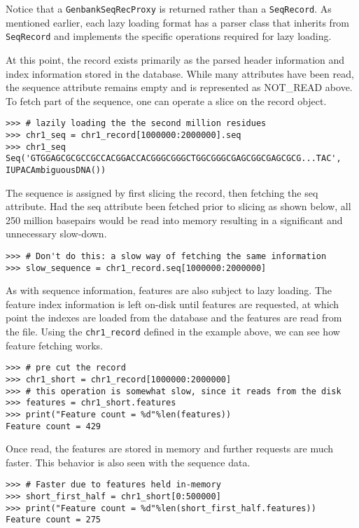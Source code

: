\documentclass{report}
\begin{document}
Notice that a \verb|GenbankSeqRecProxy| is returned rather than a
\verb|SeqRecord|. As mentioned earlier, each lazy loading format has a parser
class that inherits from \verb|SeqRecord| and implements the specific
operations required for lazy loading.

At this point, the record exists primarily as the parsed header information
and index information stored in the database. While many attributes have
been read, the sequence attribute remains empty and is represented as
NOT\_READ above. To fetch part of the sequence, one can operate a slice on
the record object.

\begin{verbatim}
>>> # lazily loading the the second million residues
>>> chr1_seq = chr1_record[1000000:2000000].seq
>>> chr1_seq
Seq('GTGGAGCGCGCCGCCACGGACCACGGGCGGGCTGGCGGGCGAGCGGCGAGCGCG...TAC',
IUPACAmbiguousDNA())
\end{verbatim}

The sequence is assigned by first slicing the record, then fetching the seq
attribute. Had the seq attribute been fetched prior to slicing as shown
below, all 250 million basepairs would be read into memory resulting in a
significant and unnecessary slow-down.

\begin{verbatim}
>>> # Don't do this: a slow way of fetching the same information
>>> slow_sequence = chr1_record.seq[1000000:2000000]
\end{verbatim}

As with sequence information, features are also subject to lazy loading.
The feature index information is left on-disk until features are requested,
at which point the indexes are loaded from the database and the features
are read from the file. Using the \verb|chr1_record| defined in the example
above, we can see how feature fetching works.

\begin{verbatim}
>>> # pre cut the record
>>> chr1_short = chr1_record[1000000:2000000]
>>> # this operation is somewhat slow, since it reads from the disk
>>> features = chr1_short.features
>>> print("Feature count = %d"%len(features))
Feature count = 429
\end{verbatim}

Once read, the features are stored in memory and further requests
are much faster. This behavior is also seen with the sequence data.

\begin{verbatim}
>>> # Faster due to features held in-memory
>>> short_first_half = chr1_short[0:500000]
>>> print("Feature count = %d"%len(short_first_half.features))
Feature count = 275
\end{verbatim}
\end{document}
